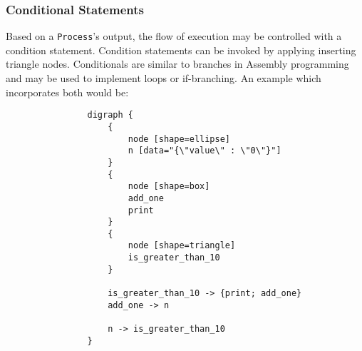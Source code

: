 \documentclass{article}
\begin{document}
			\subsubsection{Conditional Statements} Based on a \texttt{Process}'s output, the flow of execution may be controlled with a condition statement. Condition statements can be invoked by applying inserting triangle nodes. Conditionals are similar to branches in Assembly programming and may be used to implement loops or if-branching. An example which incorporates both would be: \\
			\begin{minipage}{0.5\textwidth}
				\begin{verbatim}
				digraph {
				    {
				        node [shape=ellipse]
				        n [data="{\"value\" : \"0\"}"]
				    }
				    {
				        node [shape=box]
				        add_one
				        print
				    }
				    {
				        node [shape=triangle]
				        is_greater_than_10
				    }

				    is_greater_than_10 -> {print; add_one}
				    add_one -> n

				    n -> is_greater_than_10
				}
				\end{verbatim}
			\end{minipage}
			\begin{minipage}{0.5\textwidth}
				\centering
				
			\end{minipage}
\end{document}
